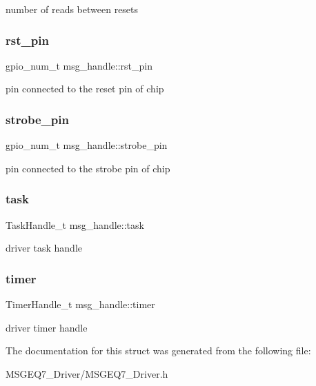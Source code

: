 number of reads between resets \mbox{\label{structmsg__handle_ad94640677937313338f02b7f5028d1eb}} 
\subsubsection{\texorpdfstring{rst\+\_\+pin}{rst\_pin}}
{\footnotesize\ttfamily gpio\+\_\+num\+\_\+t msg\+\_\+handle\+::rst\+\_\+pin}

pin connected to the reset pin of chip \mbox{\label{structmsg__handle_a63d6c0448a1ade1b6713b385b1d48fa5}} 
\subsubsection{\texorpdfstring{strobe\+\_\+pin}{strobe\_pin}}
{\footnotesize\ttfamily gpio\+\_\+num\+\_\+t msg\+\_\+handle\+::strobe\+\_\+pin}

pin connected to the strobe pin of chip \mbox{\label{structmsg__handle_a7da2ef315ab07363c565ef5f745f6888}} 
\subsubsection{\texorpdfstring{task}{task}}
{\footnotesize\ttfamily Task\+Handle\+\_\+t msg\+\_\+handle\+::task}

driver task handle \mbox{\label{structmsg__handle_a1a3b5ad7116584ac06779562d8b41ec2}} 
\subsubsection{\texorpdfstring{timer}{timer}}
{\footnotesize\ttfamily Timer\+Handle\+\_\+t msg\+\_\+handle\+::timer}

driver timer handle 

The documentation for this struct was generated from the following file\+:\begin{DoxyCompactItemize}
\item 
M\+S\+G\+E\+Q7\+\_\+\+Driver/M\+S\+G\+E\+Q7\+\_\+\+Driver.\+h\end{DoxyCompactItemize}
